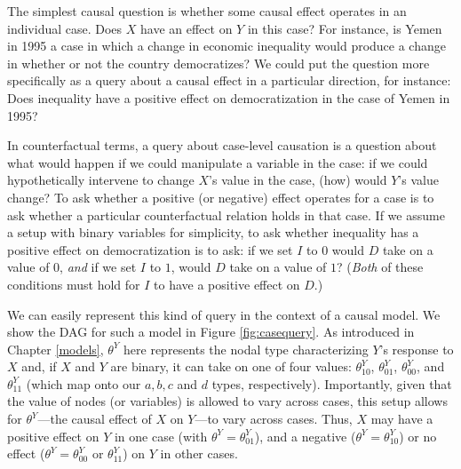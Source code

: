 \documentclass[
  12pt,
]{book}
\begin{document}
The simplest causal question is whether some causal effect operates in an individual case. Does \(X\) have an effect on \(Y\) in this case? For instance, is Yemen in 1995 a case in which a change in economic inequality would produce a change in whether or not the country democratizes? We could put the question more specifically as a query about a causal effect in a particular direction, for instance: Does inequality have a positive effect on democratization in the case of Yemen in 1995?

In counterfactual terms, a query about case-level causation is a question about what would happen if we could manipulate a variable in the case: if we could hypothetically intervene to change \(X\)'s value in the case, (how) would \(Y\)'s value change? To ask whether a positive (or negative) effect operates for a case is to ask whether a particular counterfactual relation holds in that case. If we assume a setup with binary variables for simplicity, to ask whether inequality has a positive effect on democratization is to ask: if we set \(I\) to \(0\) would \(D\) take on a value of \(0\), \emph{and} if we set \(I\) to \(1\), would \(D\) take on a value of \(1\)? (\emph{Both} of these conditions must hold for \(I\) to have a positive effect on \(D\).)

We can easily represent this kind of query in the context of a causal model. We show the DAG for such a model in Figure \ref{fig:casequery}. As introduced in Chapter \ref{models}, \(\theta^Y\) here represents the nodal type characterizing \(Y\)'s response to \(X\) and, if \(X\) and \(Y\) are binary, it can take on one of four values: \(\theta^Y_{10}\), \(\theta^Y_{01}\), \(\theta^Y_{00}\), and \(\theta^Y_{11}\) (which map onto our \(a, b, c\) and \(d\) types, respectively). Importantly, given that the value of nodes (or variables) is allowed to vary across cases, this setup allows for \(\theta^Y\)---the causal effect of \(X\) on \(Y\)---to vary across cases. Thus, \(X\) may have a positive effect on \(Y\) in one case (with \(\theta^Y=\theta^Y_{01}\)), and a negative (\(\theta^Y=\theta^Y_{10}\)) or no effect (\(\theta^Y=\theta^Y_{00}\) or \(\theta^Y_{11}\)) on \(Y\) in other cases.
\end{document}
